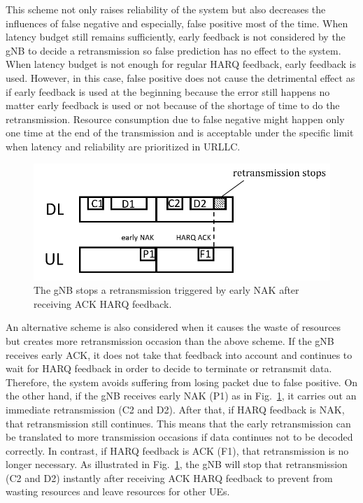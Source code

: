 \documentclass[conference]{IEEEtran}
\begin{document}
This scheme not only raises reliability of the system but also decreases the influences of false negative and especially, false positive most of the time. When latency budget still remains sufficiently, early feedback is not considered by the gNB to decide a retransmission so false prediction has no effect to the system. When latency budget is not enough for regular HARQ feedback, early feedback is used. However, in this case, false positive does not cause the detrimental effect as if early feedback is used at the beginning because the error still happens no matter early feedback is used or not because of the shortage of time to do the retransmission. Resource consumption due to false negative might happen only one time at the end of the transmission and is acceptable under the specific limit when latency and reliability are prioritized in URLLC.

\begin{figure}[htbp]
\centerline{\includegraphics[scale=0.38]{fig5.png}}
\caption{The gNB stops a retransmission triggered by early NAK after receiving ACK HARQ feedback.}
\label{fig5}
\end{figure}

An alternative scheme is also considered when it causes the waste of resources but creates more retransmission occasion than the above scheme. If the gNB receives early ACK, it does not take that feedback into account and continues to wait for HARQ feedback in order to decide to terminate or retransmit data. Therefore, the system avoids suffering from losing packet due to false positive. On the other hand, if the gNB receives early NAK (P1) as in Fig.~\ref{fig5}, it carries out an immediate retransmission (C2 and D2). After that, if HARQ feedback is NAK, that retransmission still continues. This means that the early retransmission can be translated to more transmission occasions if data continues not to be decoded correctly. In contrast, if HARQ feedback is ACK (F1), that retransmission is no longer necessary. As illustrated in Fig.~\ref{fig5}, the gNB will stop that retransmission (C2 and D2) instantly after receiving ACK HARQ feedback to prevent from wasting resources and leave resources for other UEs. 
\end{document}
